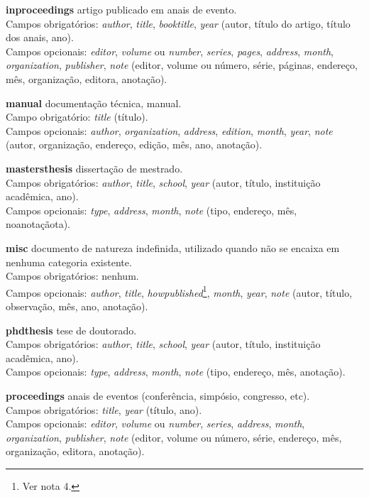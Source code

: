 \documentclass[a4paper,12pt,oneside,onecolumn,final,fleqn]{repUERJ}
\begin{document}
\begin{alinea}
\item [\textbf{inproceedings}] artigo publicado em anais de evento.\\
Campos obrigatórios: \textit{author}, \textit{title}, \textit{booktitle}, \textit{year} (autor, título do artigo, título dos anais, ano).\\
Campos opcionais: \textit{editor}, \textit{volume} ou \textit{number}, \textit{series}, \textit{pages}, \textit{address}, \textit{month}, \textit{organization}, \textit{publisher}, \textit{note} (editor, volume ou número, série, páginas, endereço, mês, organização, editora, anotação).

\item [\textbf{manual}] documentação técnica, manual.\\
Campo obrigatório: \textit{title} (título).\\
Campos opcionais: \textit{author}, \textit{organization}, \textit{address}, \textit{edition}, \textit{month}, \textit{year}, \textit{note} (autor, organização, endereço, edição, mês, ano, anotação).

\item [\textbf{mastersthesis}] dissertação de mestrado.\\
Campos obrigatórios: \textit{author}, \textit{title}, \textit{school}, \textit{year} (autor, título, instituição acadêmica, ano).\\
Campos opcionais: \textit{type}, \textit{address}, \textit{month}, \textit{note} (tipo, endereço, mês, noanotaçãota).

\item [\textbf{misc}] documento de natureza indefinida, utilizado quando não se encaixa em nenhuma categoria existente.\\
Campos obrigatórios: nenhum.\\
Campos opcionais: \textit{author}, \textit{title}, \textit{howpublished}\footnote{Ver nota 4.}, \textit{month}, \textit{year}, \textit{note} (autor, título, observação, mês, ano, anotação).

\item [\textbf{phdthesis}] tese de doutorado.\\
Campos obrigatórios: \textit{author}, \textit{title}, \textit{school}, \textit{year} (autor, título, instituição acadêmica, ano).\\
Campos opcionais: \textit{type}, \textit{address}, \textit{month}, \textit{note} (tipo, endereço, mês, anotação).

\item [\textbf{proceedings}] anais de eventos (conferência, simpósio, congresso, etc).\\
Campos obrigatórios: \textit{title}, \textit{year} (título, ano).\\
Campos opcionais: \textit{editor}, \textit{volume} ou \textit{number}, \textit{series}, \textit{address}, \textit{month}, \textit{organization}, \textit{publisher}, \textit{note} (editor, volume ou número, série, endereço, mês, organização, editora, anotação).


\end{alinea}
\end{document}
